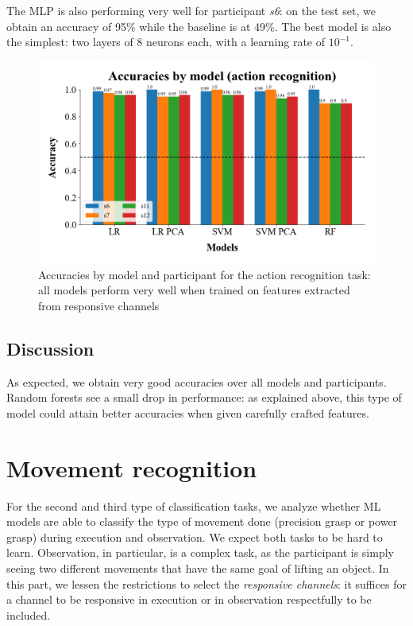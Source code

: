 \documentclass[10pt,conference,compsocconf]{IEEEtran}
\begin{document}
The MLP is also performing very well for participant \textit{s6}: on the test set, we obtain an accuracy of 95\% while the baseline is at 49\%. The best model is also the simplest: two layers of 8 neurons each, with a learning rate of \(10^{-1}\).

\begin{figure}[h!]
  \center
  \includegraphics[width=\linewidth]{../Code/figures/accuracies_across_part_ExObs.png}
  \caption{Accuracies by model and participant for the action recognition task: all models perform very well when trained on features extracted from responsive channels}
\end{figure}
\FloatBarrier

\subsection{Discussion}
As expected, we obtain very good accuracies over all models and participants. Random forests see a small drop in performance: as explained above, this type of model could attain better accuracies when given carefully crafted features.

\section{Movement recognition}
\label{sec:objectrecognition}
For the second and third type of classification tasks, we analyze whether ML models are able to classify the type of movement done (precision grasp or power grasp) during execution and observation. We expect both tasks to be hard to learn. Observation, in particular, is a complex task, as the participant is simply seeing two different movements that have the same goal of lifting an object. In this part, we lessen the restrictions to select the \textit{responsive channels}: it suffices for a channel to be responsive in execution or in observation respectfully to be included.
\end{document}
